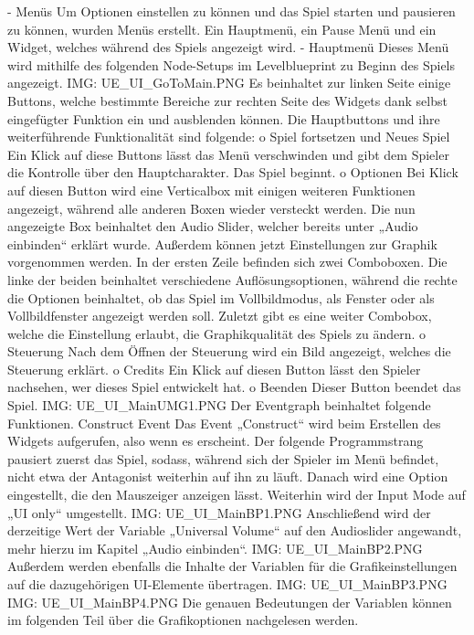 -	Menüs
Um Optionen einstellen zu können und das Spiel starten und pausieren zu können, wurden Menüs erstellt. Ein Hauptmenü, ein Pause Menü und ein Widget, welches während des Spiels angezeigt wird.
-	Hauptmenü
Dieses Menü wird mithilfe des folgenden Node-Setups im Levelblueprint zu Beginn des Spiels angezeigt.
{IMG: UE_UI_GoToMain.PNG}
Es beinhaltet zur linken Seite einige Buttons, welche bestimmte Bereiche zur rechten Seite des Widgets dank selbst eingefügter Funktion ein und ausblenden können.
Die Hauptbuttons und ihre weiterführende Funktionalität sind folgende:
o	Spiel fortsetzen und Neues Spiel
Ein Klick auf diese Buttons lässt das Menü verschwinden und gibt dem Spieler die Kontrolle über den Hauptcharakter. Das Spiel beginnt.
o	Optionen
Bei Klick auf diesen Button wird eine Verticalbox mit einigen weiteren Funktionen angezeigt, während alle anderen Boxen wieder versteckt werden. Die nun angezeigte Box beinhaltet den Audio Slider, welcher bereits unter „Audio einbinden“ erklärt wurde. Außerdem können jetzt Einstellungen zur Graphik vorgenommen werden. In der ersten Zeile befinden sich zwei Comboboxen. Die linke der beiden beinhaltet verschiedene Auflösungsoptionen, während die rechte die Optionen beinhaltet, ob das Spiel im Vollbildmodus, als Fenster oder als Vollbildfenster angezeigt werden soll. Zuletzt gibt es eine weiter Combobox, welche die Einstellung erlaubt, die Graphikqualität des Spiels zu ändern.
o	Steuerung
Nach dem Öffnen der Steuerung wird ein Bild angezeigt, welches die Steuerung erklärt.
o	Credits
Ein Klick auf diesen Button lässt den Spieler nachsehen, wer dieses Spiel entwickelt hat.
o	Beenden
Dieser Button beendet das Spiel.
{IMG: UE_UI_MainUMG1.PNG}
Der Eventgraph beinhaltet folgende Funktionen.
Construct Event
Das Event „Construct“ wird beim Erstellen des Widgets aufgerufen, also wenn es erscheint. Der folgende Programmstrang pausiert zuerst das Spiel, sodass, während sich der Spieler im Menü befindet, nicht etwa der Antagonist weiterhin auf ihn zu läuft. Danach wird eine Option eingestellt, die den Mauszeiger anzeigen lässt. Weiterhin wird der Input Mode auf „UI only“ umgestellt.
{IMG: UE_UI_MainBP1.PNG}
Anschließend wird der derzeitige Wert der Variable „Universal Volume“ auf den Audioslider angewandt, mehr hierzu im Kapitel „Audio einbinden“.
{IMG: UE_UI_MainBP2.PNG}
Außerdem werden ebenfalls die Inhalte der Variablen für die Grafikeinstellungen auf die dazugehörigen UI-Elemente übertragen.
{IMG: UE_UI_MainBP3.PNG}
{IMG: UE_UI_MainBP4.PNG}
Die genauen Bedeutungen der Variablen können im folgenden Teil über die Grafikoptionen nachgelesen werden.
